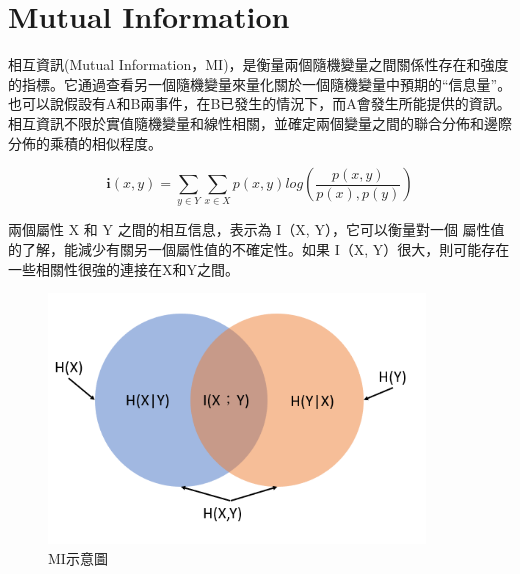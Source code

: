 \chapter{Mutual Information}
\label{chapter:intro}
相互資訊(Mutual Information，MI)，是衡量兩個隨機變量之間關係性存在和強度的指標。它通過查看另一個隨機變量來量化關於一個隨機變量中預期的“信息量”。也可以說假設有A和B兩事件，在B已發生的情況下，而A會發生所能提供的資訊。相互資訊不限於實值隨機變量和線性相關，並確定兩個變量之間的聯合分佈和邊際分佈的乘積的相似程度。



$$\textbf{i}(x,y)=\sum_{y\in Y}^{}\sum_{x\in X}^{}p(x,y)log(\frac{p(x,y)}{p(x),p(y)})$$

        兩個屬性 X 和 Y 之間的相互信息，表示為 I（X, Y），它可以衡量對一個 屬性值的了解，能減少有關另一個屬性值的不確定性。如果 I（X, Y）很大，則可能存在一些相關性很強的連接在X和Y之間。

        \begin{figure}[h]
            \centering
            \includegraphics[width=10cm]{./pic/MI.PNG}
            \caption{MI示意圖}
            \label{fig:MI}
        \end{figure}

